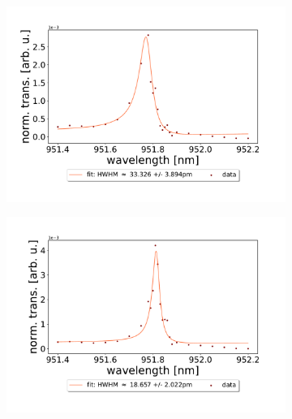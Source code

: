 \begin{figure}[h!]
    \centering
    \begin{subfigure}[b]{0.49\textwidth}
        \includegraphics[width=\textwidth]{figures/results/single fano fits/60um_M5_fit_1.pdf}
        \caption{}
        \label{fig:60um_M5_fit_1}
    \end{subfigure}
    \begin{subfigure}[b]{0.49\textwidth}
        \includegraphics[width=\textwidth]{figures/results/single fano fits/60um_M5_fit_2.pdf}
        \caption{}
        \label{fig:60um_M5_fit_2}
    \end{subfigure}
    \begin{subfigure}[b]{0.49\textwidth}

\end{subfigure}
\end{figure}
